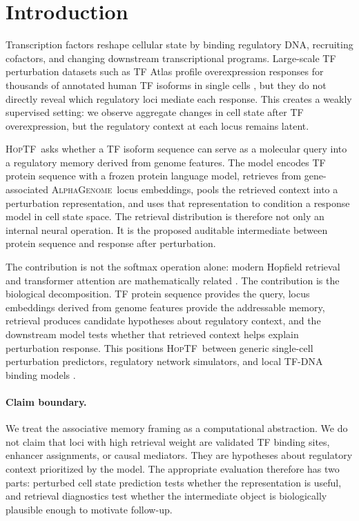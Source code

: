 \documentclass{article}
\newcommand{\hoptf}{\textsc{HopTF}}
\newcommand{\ag}{\textsc{AlphaGenome}}
\begin{document}
\section{Introduction}

Transcription factors reshape cellular state by binding regulatory DNA, recruiting cofactors, and changing downstream transcriptional programs. Large-scale TF perturbation datasets such as TF Atlas profile overexpression responses for thousands of annotated human TF isoforms in single cells \citep{joung2023}, but they do not directly reveal which regulatory loci mediate each response. This creates a weakly supervised setting: we observe aggregate changes in cell state after TF overexpression, but the regulatory context at each locus remains latent.

\hoptf\ asks whether a TF isoform sequence can serve as a molecular query into a regulatory memory derived from genome features. The model encodes TF protein sequence with a frozen protein language model, retrieves from gene-associated \ag\ locus embeddings, pools the retrieved context into a perturbation representation, and uses that representation to condition a response model in cell state space. The retrieval distribution is therefore not only an internal neural operation. It is the proposed auditable intermediate between protein sequence and response after perturbation.

The contribution is not the softmax operation alone: modern Hopfield retrieval and transformer attention are mathematically related \citep{ramsauer2021,vaswani2017}. The contribution is the biological decomposition. TF protein sequence provides the query, locus embeddings derived from genome features provide the addressable memory, retrieval produces candidate hypotheses about regulatory context, and the downstream model tests whether that retrieved context helps explain perturbation response. This positions \hoptf\ between generic single-cell perturbation predictors, regulatory network simulators, and local TF-DNA binding models \citep{roohani2023,bunne2023,kamimoto2023,gonzalezblas2023,basnet2026,liutfbindformer2026,fu2026}.

\paragraph{Claim boundary.}
We treat the associative memory framing as a computational abstraction. We do not claim that loci with high retrieval weight are validated TF binding sites, enhancer assignments, or causal mediators. They are hypotheses about regulatory context prioritized by the model. The appropriate evaluation therefore has two parts: perturbed cell state prediction tests whether the representation is useful, and retrieval diagnostics test whether the intermediate object is biologically plausible enough to motivate follow-up.
\end{document}
